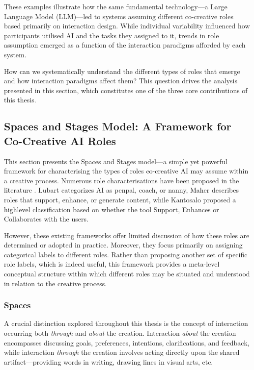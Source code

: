 These examples illustrate how the same fundamental technology—a Large Language Model (LLM)—led to systems assuming different co-creative roles based primarily on interaction design. While individual variability influenced how participants utilised AI and the tasks they assigned to it, trends in role assumption emerged as a function of the interaction paradigms afforded by each system.

How can we systematically understand the different types of roles that emerge and how interaction paradigms affect them? This question drives the analysis presented in this section, which constitutes one of the three core contributions of this thesis.

\subsection{Spaces and Stages Model: A Framework for Co-Creative AI Roles}

This section presents the Spaces and Stages model—a simple yet powerful framework for characterising the types of roles co-creative AI may assume within a creative process. Numerous role characterisations have been proposed in the literature \cite{Lubart2005-zi, Kantosalo2019-pz, Maher2012-oj}. Lubart categorizes AI as penpal, coach, or nanny, Maher describes roles that support, enhance, or generate content, while Kantosalo proposed a highlevel classification based on whether the tool Support, Enhances or Collaborates with the users.

However, these existing frameworks offer limited discussion of how these roles are determined or adopted in practice. Moreover, they focus primarily on assigning categorical labels to different roles. Rather than proposing another set of specific role labels, which is indeed useful, this framework provides a meta-level conceptual structure within which different roles may be situated and understood in relation to the creative process.

\subsubsection{Spaces}

A crucial distinction explored throughout this thesis is the concept of interaction occurring both \textit{through} and \textit{about} the creation. Interaction \textit{about} the creation encompasses discussing goals, preferences, intentions, clarifications, and feedback, while interaction \textit{through} the creation involves acting directly upon the shared artifact—providing words in writing, drawing lines in visual arts, etc.

